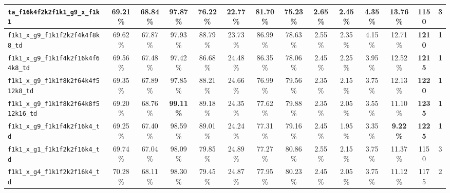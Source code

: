\documentclass{article}
\begin{document}
\begin{table}[t]
{\begin{minipage}{\linewidth}
{\begin{tabular}{@{}l|ccccccc|cccc|cc@{}}
	\texttt{ta\_f16k4f2k2f1k1\_g9\_x\_f1k1}        &          69.21\% &          68.84\% &          97.87\% &          76.22\% &          22.77\% &          81.70\% &          75.23\% &           2.65\% &           2.45\% &           4.35\% &          13.76\% &          1150 &           3  \\
	\midrule
	\texttt{f1k1\_x\_g9\_f1k1f2k2f4k4f8k8\_td}     &          69.62\% &          67.87\% &          97.93\% &          88.79\% &          23.73\% &          86.99\% &          78.63\% &           2.55\% &           2.35\% &           4.15\% &          12.71\% & \textbf{1210} &  \textbf{1}  \\
	\texttt{f1k1\_x\_g9\_f1k1f4k2f16k4f64k8\_td}   &          69.56\% &          67.48\% &          97.42\% &          86.68\% &          24.48\% &          86.35\% &          78.06\% &           2.45\% &           2.25\% &           3.95\% &          12.52\% & \textbf{1215} &  \textbf{1}  \\
	\texttt{f1k1\_x\_g9\_f1k1f8k2f64k4f512k8\_td}  &          69.35\% &          67.89\% &          97.85\% &          88.21\% &          24.66\% &          76.99\% &          79.56\% &           2.35\% &           2.15\% &           3.75\% &          12.13\% & \textbf{1220} &  \textbf{1}  \\
	\texttt{f1k1\_x\_g9\_f1k1f8k2f64k8f512k16\_td} &          69.20\% &          68.76\% & \textbf{99.11\%} &          89.18\% &          24.35\% &          77.62\% &          79.88\% &           2.35\% &           2.05\% &           3.55\% &          11.10\% & \textbf{1235} &  \textbf{1}  \\
	\texttt{f1k1\_x\_g9\_f1k1f4k2f16k4\_td}        &          69.25\% &          67.40\% &          98.59\% &          89.01\% &          24.24\% &          77.31\% &          79.16\% &           2.45\% &           1.95\% &           3.35\% &  \textbf{9.22\%} & \textbf{1225} &  \textbf{1}  \\
	\texttt{f1k1\_x\_g1\_f1k1f2k2f16k4\_td}        &          69.74\% &          67.04\% &          98.09\% &          79.85\% &          24.89\% &          77.27\% &          80.86\% &           2.55\% &           2.15\% &           3.75\% &          11.37\% &          1150 &           3  \\
	\texttt{f1k1\_x\_g4\_f1k1f2k2f16k4\_td}        &          70.28\% &          68.11\% &          98.30\% &          79.45\% &          24.87\% &          77.95\% &          80.23\% &           2.45\% &           2.05\% &           3.75\% &          11.12\% &          1175 &           2  \\

\end{tabular}}
\end{minipage}}
\end{table}
\end{document}
